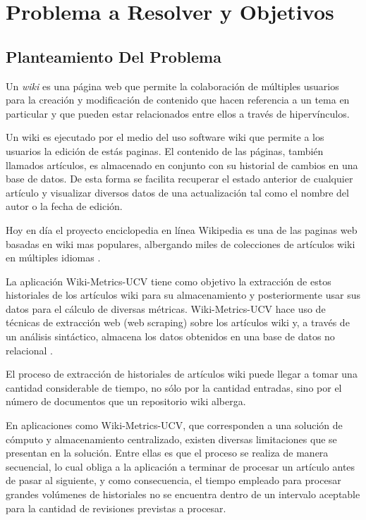 \section{Problema a Resolver y Objetivos}

\subsection{Planteamiento Del Problema}

Un \emph{wiki} es una página web que permite la colaboración de múltiples usuarios para
la creación y modificación de contenido que hacen referencia a un tema en particular y
que pueden estar relacionados entre ellos a través de hipervínculos.

Un wiki es ejecutado por el medio del uso software wiki que permite a los usuarios la edición
de estás paginas. El contenido de las páginas, también llamados artículos, es almacenado en conjunto
con su historial de cambios en una base de datos. De esta forma se facilita recuperar el estado
anterior de cualquier artículo y visualizar diversos datos de una actualización tal como el
nombre del autor o la fecha de edición.

Hoy en día el proyecto enciclopedia en línea Wikipedia es una de las paginas web basadas en wiki
mas populares, albergando miles de colecciones de artículos wiki en múltiples idiomas \cite{3}.

La aplicación Wiki-Metrics-UCV tiene como objetivo la extracción de estos historiales
de los artículos wiki para su almacenamiento y posteriormente usar sus datos para
el cálculo de diversas métricas. Wiki-Metrics-UCV hace uso de técnicas de extracción web (web
scraping) sobre los artículos wiki y, a través de un análisis sintáctico, almacena los datos
obtenidos en una base de datos no relacional \cite{4}.

El proceso de extracción de historiales de artículos wiki puede llegar a tomar
una cantidad considerable de tiempo, no sólo por la cantidad entradas,
sino por el número de documentos que un repositorio wiki alberga.

En aplicaciones como Wiki-Metrics-UCV, que corresponden a una solución de cómputo y almacenamiento
centralizado, existen diversas limitaciones que se presentan en la solución. Entre ellas es
que el proceso se realiza de manera secuencial, lo cual obliga a la aplicación a terminar
de procesar un artículo antes de pasar al siguiente, y como consecuencia, el tiempo
empleado para procesar grandes volúmenes de historiales no se encuentra dentro de un
intervalo aceptable para la cantidad de revisiones previstas a procesar.

